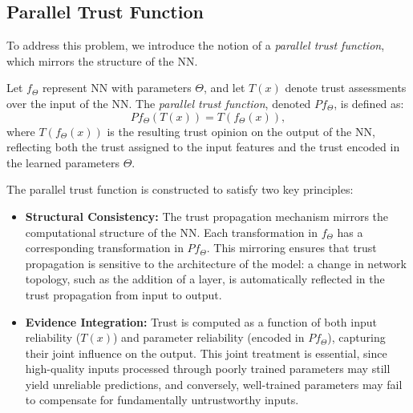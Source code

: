 \subsection{Parallel Trust Function}
To address this problem, we introduce the notion of a \emph{parallel trust function}, which mirrors the structure of the \ac{NN}.

\begin{definition}
Let $f_\Theta$ represent \ac{NN} with parameters $\Theta$, and let $T(x)$ denote trust assessments over the input of the \ac{NN}. The \emph{parallel trust function}, denoted $Pf_\Theta$, is defined as:
\[
Pf_\Theta(T(x)) = T(f_\Theta(x)),
\]
where $T(f_\Theta(x))$ is the resulting trust opinion on the output of the \ac{NN}, reflecting both the trust assigned to the input features and the trust encoded in the learned parameters $\Theta$.
\end{definition}

The parallel trust function is constructed to satisfy two key principles:
\begin{itemize}
    \item \textbf{Structural Consistency:} The trust propagation mechanism mirrors the computational structure of the \ac{NN}. Each transformation in $f_\Theta$ has a corresponding transformation in $Pf_\Theta$. This mirroring ensures that trust propagation is sensitive to the architecture of the model: a change in network topology, such as the addition of a layer, is automatically reflected in the trust propagation from input to output.

    \item \textbf{Evidence Integration:} Trust is computed as a function of both input reliability ($T(x)$) and parameter reliability (encoded in $Pf_\Theta$), capturing their joint influence on the output. This joint treatment is essential, since high-quality inputs processed through poorly trained parameters may still yield unreliable predictions, and conversely, well-trained parameters may fail to compensate for fundamentally untrustworthy inputs.

\end{itemize}

